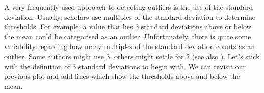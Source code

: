 \documentclass[
]{book}
\newenvironment{Shaded}{\begin{snugshade}}{\end{snugshade}}
\newcommand{\AttributeTok}[1]{\textcolor[rgb]{0.77,0.63,0.00}{#1}}
\newcommand{\CommentTok}[1]{\textcolor[rgb]{0.56,0.35,0.01}{\textit{#1}}}
\newcommand{\ConstantTok}[1]{\textcolor[rgb]{0.00,0.00,0.00}{#1}}
\newcommand{\DecValTok}[1]{\textcolor[rgb]{0.00,0.00,0.81}{#1}}
\newcommand{\FunctionTok}[1]{\textcolor[rgb]{0.00,0.00,0.00}{#1}}
\newcommand{\NormalTok}[1]{#1}
\newcommand{\OtherTok}[1]{\textcolor[rgb]{0.56,0.35,0.01}{#1}}
\newcommand{\SpecialCharTok}[1]{\textcolor[rgb]{0.00,0.00,0.00}{#1}}
\newcommand{\StringTok}[1]{\textcolor[rgb]{0.31,0.60,0.02}{#1}}
\begin{document}
A very frequently used approach to detecting outliers is the use of the standard deviation. Usually, scholars use multiples of the standard deviation to determine thresholds. For example, a value that lies 3 standard deviations above or below the mean could be categorised as an outlier. Unfortunately, there is quite some variability regarding how many multiples of the standard deviation counts as an outlier. Some authors might use 3, others might settle for 2 (see also \citet{leys2013detecting}). Let's stick with the definition of 3 standard deviations to begin with. We can revisit our previous plot and add lines which show the thresholds above and below the mean.

\begin{Shaded}
\end{Shaded}
\end{document}

